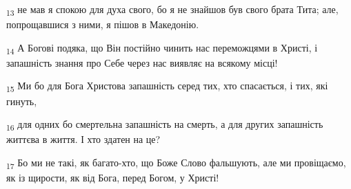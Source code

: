 \begin{tcolorbox}
\textsubscript{13} не мав я спокою для духа свого, бо я не знайшов був свого брата Тита; але, попрощавшися з ними, я пішов в Македонію.
\end{tcolorbox}
\begin{tcolorbox}
\textsubscript{14} А Богові подяка, що Він постійно чинить нас переможцями в Христі, і запашність знання про Себе через нас виявляє на всякому місці!
\end{tcolorbox}
\begin{tcolorbox}
\textsubscript{15} Ми бо для Бога Христова запашність серед тих, хто спасається, і тих, які гинуть,
\end{tcolorbox}
\begin{tcolorbox}
\textsubscript{16} для одних бо смертельна запашність на смерть, а для других запашність життєва в життя. І хто здатен на це?
\end{tcolorbox}
\begin{tcolorbox}
\textsubscript{17} Бо ми не такі, як багато-хто, що Боже Слово фальшують, але ми провіщаємо, як із щирости, як від Бога, перед Богом, у Христі!
\end{tcolorbox}
